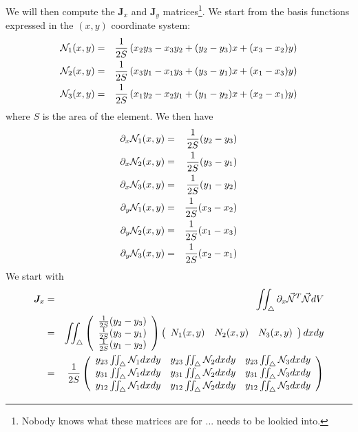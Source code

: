 We will then compute the ${\bm J}_x$ and ${\bm J}_y$ matrices\footnote{Nobody 
knows what these matrices are for ... needs to be lookied into.}.
We start from the basis functions expressed in the $(x,y)$ coordinate system:
\begin{eqnarray}
{\mathcal{N}}_1(x,y) &=& \frac{1}{2S} \left( x_2y_3-x_3y_2+(y_2-y_3)x+(x_3-x_2)y   \right) \nonumber\\
{\mathcal{N}}_2(x,y) &=& \frac{1}{2S} \left( x_3y_1-x_1y_3+(y_3-y_1)x+(x_1-x_3)y   \right) \nonumber\\
{\mathcal{N}}_3(x,y) &=& \frac{1}{2S} \left( x_1y_2-x_2y_1+(y_1-y_2)x+(x_2-x_1)y   \right) \nonumber
\end{eqnarray}
where $S$ is the area of the element.
We then have 
\begin{eqnarray}
\partial_x {\mathcal{N}}_1(x,y) &=& \frac{1}{2S}  (y_2-y_3) \nonumber\\
\partial_x {\mathcal{N}}_2(x,y) &=& \frac{1}{2S}  (y_3-y_1) \nonumber\\
\partial_x {\mathcal{N}}_3(x,y) &=& \frac{1}{2S}  (y_1-y_2) \nonumber\\
\partial_y {\mathcal{N}}_1(x,y) &=& \frac{1}{2S}  (x_3-x_2) \nonumber\\
\partial_y {\mathcal{N}}_2(x,y) &=& \frac{1}{2S}  (x_1-x_3) \nonumber\\
\partial_y {\mathcal{N}}_3(x,y) &=& \frac{1}{2S}  (x_2-x_1) \nonumber
\end{eqnarray}
We start with
\begin{eqnarray}
{\bm J}_x
&=& \iint_\triangle  \partial_x \vec{{\mathcal{N}}}^T \vec{{\mathcal{N}}} dV \nonumber\\
&=&  \iint_\triangle 
\left(
\begin{array}{c}
\frac{1}{2S}(y_2-y_3) \\
\frac{1}{2S}(y_3-y_1) \\
\frac{1}{2S}(y_1-y_2)
\end{array}
\right)
\left(
\begin{array}{ccc}
N_1(x,y) & N_2(x,y) & N_3(x,y) 
\end{array}
\right) dx dy \nonumber\\
&=& \frac{1}{2S} 
\left(
\begin{array}{ccc}
y_{23} \iint_\triangle {\mathcal{N}}_1 dx dy & y_{23} \iint_\triangle {\mathcal{N}}_2 dx dy & y_{23} \iint_\triangle {\mathcal{N}}_3 dx dy \\
y_{31} \iint_\triangle {\mathcal{N}}_1 dx dy & y_{31} \iint_\triangle {\mathcal{N}}_2 dx dy & y_{31} \iint_\triangle {\mathcal{N}}_3 dx dy \\
y_{12} \iint_\triangle {\mathcal{N}}_1 dx dy & y_{12} \iint_\triangle {\mathcal{N}}_2 dx dy & y_{12} \iint_\triangle {\mathcal{N}}_3 dx dy 
\end{array}
\right) 
\end{eqnarray}
